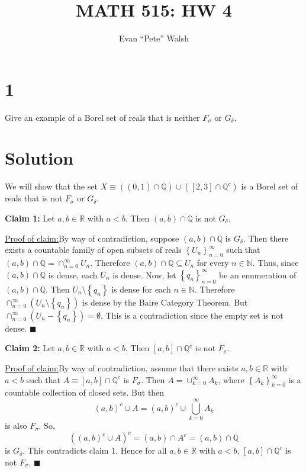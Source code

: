 \documentclass[12pt]{article}
\title{MATH 515: HW 4}
\author{Evan ``Pete'' Walsh}
\newenvironment{claimproof}[1]{\par\noindent\underline{Proof of claim:}\space#1}{\hfill $\blacksquare$}
\begin{document}
\maketitle

\section*{1}

Give an example of a Borel set of reals that is neither $F_{\sigma}$ or $G_{\delta}$.

\section*{Solution}

We will show that the set $X \equiv \left( (0,1)\cap \mathbb{Q} \right)\cup \left( [2,3]\cap \mathbb{Q}^{c} \right)$ is a Borel set of reals that is not
$F_{\sigma}$ or $G_{\delta}$.

{\bf Claim 1:} Let $a,b \in \mathbb{R}$ with $a < b$. Then $(a,b) \cap \mathbb{Q}$ is not $G_{\delta}$.
\begin{claimproof}
By way of contradiction, suppose $(a,b) \cap \mathbb{Q}$ is $G_{\delta}$. Then there exists a countable family of open subsets of reals $\left\{ U_{n}
\right\}_{n=0}^{\infty}$ such that $(a,b) \cap \mathbb{Q} = \cap_{n=0}^{\infty}U_{n}$. Therefore $(a,b)\cap\mathbb{Q} \subseteq U_{n}$ for every $n\in \mathbb{N}$. 
Thus, since $(a,b)\cap\mathbb{Q}$ is dense, each $U_{n}$ is dense. Now, let $\left\{ q_{n} \right\}_{n=0}^{\infty}$ be an enumeration of $(a,b)\cap\mathbb{Q}$.
Then $U_{n} \setminus \left\{ q_{n} \right\}$ is dense for each $n\in \mathbb{N}$. Therefore $\cap_{n=0}^{\infty}(U_{n}\setminus\left\{ q_{n}
\right\})$ is dense by the Baire Category Theorem. But $\cap_{n=0}^{\infty}(U_{n} - \left\{ q_{n} \right\}) = \emptyset$. This is a contradiction
since the empty set is not dense.
\end{claimproof}

{\bf Claim 2:} Let $a, b \in \mathbb{R}$ with $a < b$. Then $[a,b] \cap \mathbb{Q}^{c}$ is not $F_{\sigma}$.
\begin{claimproof}
By way of contradiction, assume that there exists $a,b\in\mathbb{R}$ with $a < b$ such that $A \equiv [a,b] \cap \mathbb{Q}^{c}$ is $F_{\sigma}$. Then $A =
\cup_{k=0}^{\infty}A_{k}$, where $\left\{ A_{k} \right\}_{k=0}^{\infty}$ is a countable collection of closed sets. But then 
\[ 
(a,b)^{c} \cup A = (a, b)^{c} \cup \bigcup_{k=0}^{\infty}A_{k} \]
is also $F_{\sigma}$. So,
\[ \left( (a,b)^{c} \cup A \right)^{c} = (a,b) \cap  A^{c} = (a, b) \cap \mathbb{Q} \]
is $G_{\delta}$. This contradicts claim 1. Hence for all $a,b\in\mathbb{R}$ with $a < b$, $[a,b] \cap \mathbb{Q}^{c}$ is not $F_{\sigma}$.
\end{claimproof}
\end{document}
